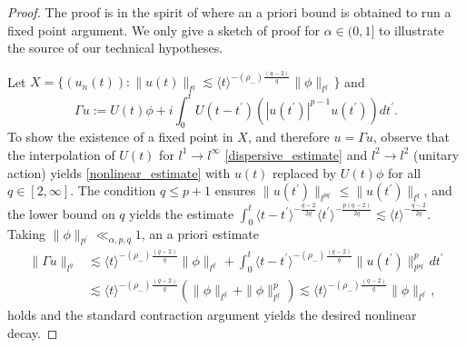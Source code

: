 \documentclass{article}
\numberwithin{equation}{section}
\begin{document}
\begin{proof}
The proof is in the spirit of \cite[Theorem 7]{stefanov2005asymptotic} where an a priori bound is obtained to run a fixed point argument. We only give a sketch of proof for $\alpha \in (0,1]$ to illustrate the source of our technical hypotheses.

Let $X = \{(u_n(t)): \| u(t) \|_{l^q} \lesssim \langle t \rangle^{-(\rho_{-})\frac{(q-2)}{q}} \| \phi \|_{l^{q^\prime}}\}$ and 
\begin{equation}\label{duhamel}
\Gamma u := U(t) \phi + i \int_0^t U(t-t^\prime) \left(|u(t^\prime)|^{p-1}u(t^\prime)\right)dt^\prime.    
\end{equation}
To show the existence of a fixed point in $X$, and therefore $u = \Gamma u$, observe that the interpolation of $U(t)$ for $l^1 \rightarrow l^\infty$ \eqref{dispersive_estimate} and $l^2 \rightarrow l^2$ (unitary action) yields \eqref{nonlinear_estimate} with $u(t)$ replaced by $U(t)\phi$ for all $q \in [2,\infty]$. The condition $q \leq p+1$ ensures $\| u(t^\prime) \|_{l^{pq^\prime}} \leq \| u(t^\prime) \|_{l^{q}}$, and the lower bound on $q$ yields the estimate $\int_0^t \langle t-t^\prime\rangle^{-\frac{q-2}{2q}} \langle t^\prime \rangle^{-\frac{p(q-2)}{2q}} \lesssim \langle t \rangle^{-\frac{q-2}{2q}}$. Taking $\| \phi \|_{l^{q^\prime}} \ll_{\alpha,p,q} 1$, an a priori estimate
\begin{equation*}
\begin{split}
\| \Gamma u \|_{l^q} &\lesssim \langle t \rangle^{-(\rho_{-})\frac{(q-2)}{q}} \| \phi \|_{l^{q^\prime}} + \int_0^t \langle t-t^\prime \rangle^{-(\rho_{-})\frac{(q-2)}{q}} \| u(t^\prime)\|_{l^{pq^\prime}}^p dt^\prime\\
&\lesssim \langle t \rangle^{-(\rho_{-})\frac{(q-2)}{q}} ( \| \phi \|_{l^{q^\prime}} + \| \phi \|_{l^{q^\prime}}^p) \lesssim \langle t \rangle^{-(\rho_{-})\frac{(q-2)}{q}} \| \phi \|_{l^{q^\prime}},
\end{split}
\end{equation*}
holds and the standard contraction argument yields the desired nonlinear decay.
\end{proof}
\end{document}

